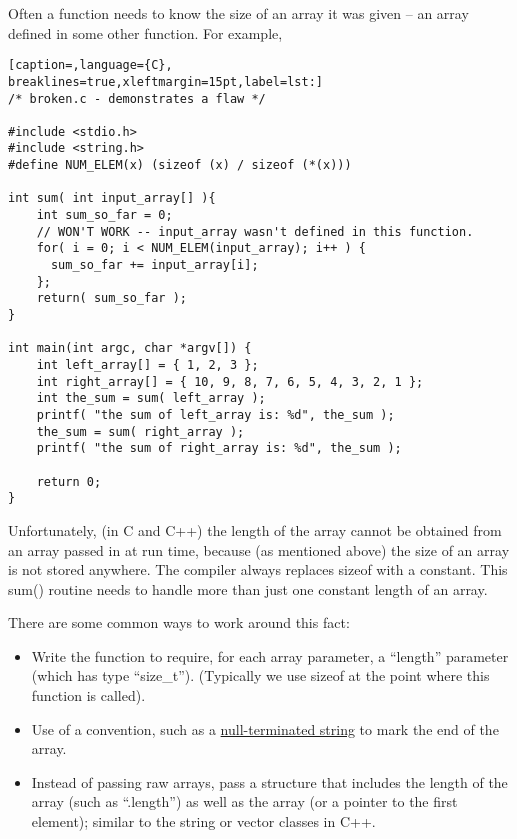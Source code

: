 Often a function needs to know the size of an array it was given -- an array
defined in some other function.
For example,
\lstset{basicstyle=\scriptsize, numbers=left, captionpos=b, tabsize=4}
\begin{lstlisting}[caption=,language={C},
breaklines=true,xleftmargin=15pt,label=lst:]
/* broken.c - demonstrates a flaw */
 
#include <stdio.h>
#include <string.h>
#define NUM_ELEM(x) (sizeof (x) / sizeof (*(x)))
 
int sum( int input_array[] ){
	int sum_so_far = 0;
	// WON'T WORK -- input_array wasn't defined in this function.
	for( i = 0; i < NUM_ELEM(input_array); i++ ) {
	  sum_so_far += input_array[i];
	};
	return( sum_so_far );
}
 
int main(int argc, char *argv[]) {
	int left_array[] = { 1, 2, 3 };
	int right_array[] = { 10, 9, 8, 7, 6, 5, 4, 3, 2, 1 };
	int the_sum = sum( left_array );
	printf( "the sum of left_array is: %d", the_sum );
	the_sum = sum( right_array );
	printf( "the sum of right_array is: %d", the_sum );
	
	return 0;
}
\end{lstlisting}

Unfortunately, (in C and C++) the length of the array cannot be obtained from
an array passed in at run time, because (as mentioned above) the size of an
array is not stored anywhere.  The compiler always replaces sizeof with a
constant.  This sum() routine needs to handle more than just one constant
length of an array.

There are some common ways to work around this fact:
\begin{itemize}
	\item Write the function to require, for each array parameter, a ``length''
parameter (which has type ``size\_t''). (Typically we use sizeof at the point
where this function is called).
	\item Use of a convention, such as a
\href{http://en.wikipedia.org/wiki/null-terminated_string}{null-terminated
string} to mark the end of the array.
	\item Instead of passing raw arrays, pass a structure that includes the
length of the array (such as ``.length'') as well as the array (or a pointer to
the first element); similar to the string or vector classes in C++.
\end{itemize}

